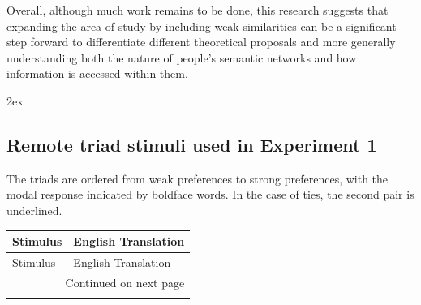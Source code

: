 \documentclass[doc]{apa6}
\begin{document}
Overall, although much work remains to be done, this research suggests that expanding the area of study by including weak similarities can be a significant step forward to differentiate different theoretical proposals and more generally understanding both the nature of people's semantic networks and how information is accessed within them.

\printbibliography

\newpage
\begingroup
\parindent 0pt
\parskip 2ex
\def\enotesize{\normalsize}
\theendnotes
\endgroup

\begin{appendix}
\section{Remote triad stimuli used in Experiment 1}
\begin{small}
The triads are ordered from weak preferences to strong preferences, with the modal response indicated by
boldface words. In the case of ties, the second pair is underlined.


\begin{longtable}{ll}
\label{table:AppendixRemoteTriads}
Stimulus  & English Translation\\
\toprule
\endfirsthead

Stimulus  & English Translation\\
\toprule
\endhead

\bottomrule
\multicolumn{2}{r}{Continued on next page} \\
\endfoot


\end{longtable}
\end{small}
\end{appendix}
\end{document}
